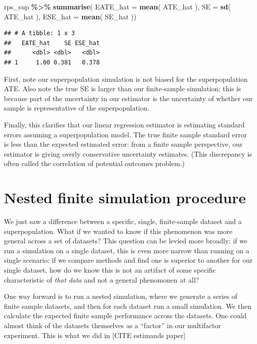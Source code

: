 \documentclass[
]{book}
\newenvironment{Shaded}{\begin{snugshade}}{\end{snugshade}}
\newcommand{\AttributeTok}[1]{\textcolor[rgb]{0.13,0.29,0.53}{#1}}
\newcommand{\FunctionTok}[1]{\textcolor[rgb]{0.13,0.29,0.53}{\textbf{#1}}}
\newcommand{\NormalTok}[1]{#1}
\newcommand{\SpecialCharTok}[1]{\textcolor[rgb]{0.81,0.36,0.00}{\textbf{#1}}}
\begin{document}
\begin{Shaded}
\begin{Highlighting}[]
\NormalTok{rps\_sup }\SpecialCharTok{\%\textgreater{}\%} \FunctionTok{summarise}\NormalTok{( }\AttributeTok{EATE\_hat =} \FunctionTok{mean}\NormalTok{( ATE\_hat ),}
                   \AttributeTok{SE =} \FunctionTok{sd}\NormalTok{( ATE\_hat ),}
                   \AttributeTok{ESE\_hat =} \FunctionTok{mean}\NormalTok{( SE\_hat ))}
\end{Highlighting}
\end{Shaded}

\begin{verbatim}
## # A tibble: 1 x 3
##   EATE_hat    SE ESE_hat
##      <dbl> <dbl>   <dbl>
## 1     1.00 0.381   0.378
\end{verbatim}

First, note our superpopulation simulation is not biased for the superpopulation ATE.
Also note the true SE is larger than our finite-sample simulation; this is because part of the uncertainty in our estimator is the uncertainty of whether our sample is representative of the superpopulation.

Finally, this clarifies that our linear regression estimator is estimating standard errors assuming a superpopulation model.
The true finite sample standard error is less than the expected estimated error: from a finite sample perspective, our estimator is giving overly conservative uncertainty estimates.
(This discrepancy is often called the correlation of potential outcomes problem.)

\section{Nested finite simulation procedure}\label{nested-finite-simulation-procedure}

We just saw a difference between a specific, single, finite-sample dataset and a superpopulation.
What if we wanted to know if this phenomenon was more general across a set of datasets?
This question can be levied more broadly: if we run a simulation on a single dataset, this is even more narrow than running on a single scenario: if we compare methods and find one is superior to another for our single dataset, how do we know this is not an artifact of some specific characteristic of \emph{that data} and not a general phenomonen at all?

One way forward is to run a nested simulation, where we generate a series of finite sample datasets, and then for each dataset run a small simulation.
We then calculate the expected finite sample performance across the datasets.
One could almost think of the datasets themselves as a ``factor'' in our multifactor experiment.
This is what we did in {[}CITE estimands paper{]}
\end{document}
